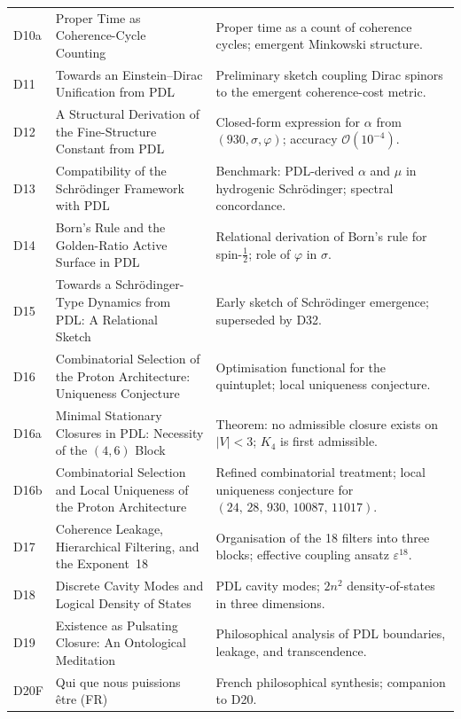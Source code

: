 \documentclass[11pt,a4paper]{article}
\theoremstyle{plain}
\theoremstyle{definition}
\theoremstyle{remark}
\newcommand{\quintuplet}{(24,\,28,\,930,\,10087,\,11017)}
\begin{document}
\begin{longtable}{L{1.3cm}L{3.8cm}L{8.0cm}}
D10a & Proper Time as Coherence-Cycle Counting~\cite{D10a} & Proper time as a count of coherence cycles; emergent Minkowski structure.\\[0.3em]
D11 & Towards an Einstein--Dirac Unification from PDL~\cite{D11} & Preliminary sketch coupling Dirac spinors to the emergent coherence-cost metric.\\[0.3em]
D12 & A Structural Derivation of the Fine-Structure Constant from PDL~\cite{D12} & Closed-form expression for $\alpha$ from $(930, \sigma, \varphi)$; accuracy $\mathcal{O}(10^{-4})$.\\[0.3em]
D13 & Compatibility of the Schr\"odinger Framework with PDL~\cite{D13} & Benchmark: PDL-derived $\alpha$ and $\mu$ in hydrogenic Schr\"odinger; spectral concordance.\\[0.3em]
D14 & Born's Rule and the Golden-Ratio Active Surface in PDL~\cite{D14} & Relational derivation of Born's rule for spin-$\tfrac{1}{2}$; role of $\varphi$ in $\sigma$.\\[0.3em]
D15 & Towards a Schr\"odinger-Type Dynamics from PDL: A Relational Sketch~\cite{D15} & Early sketch of Schr\"odinger emergence; superseded by D32.\\[0.3em]
D16 & Combinatorial Selection of the Proton Architecture: Uniqueness Conjecture~\cite{D16} & Optimisation functional for the quintuplet; local uniqueness conjecture.\\[0.3em]
D16a & Minimal Stationary Closures in PDL: Necessity of the $(4,6)$ Block~\cite{D16a} & \textcolor{proofblue}{Theorem}: no admissible closure exists on $|V|<3$; $K_4$ is first admissible.\\[0.3em]
D16b & Combinatorial Selection and Local Uniqueness of the Proton Architecture~\cite{D16b} & Refined combinatorial treatment; local uniqueness conjecture for $\quintuplet$.\\[0.3em]
D17 & Coherence Leakage, Hierarchical Filtering, and the Exponent~18~\cite{D17} & Organisation of the 18 filters into three blocks; effective coupling ansatz $\varepsilon^{18}$.\\[0.3em]
D18 & Discrete Cavity Modes and Logical Density of States~\cite{D18} & PDL cavity modes; $2n^2$ density-of-states in three dimensions.\\[0.3em]
D19 & Existence as Pulsating Closure: An Ontological Meditation~\cite{D19} & Philosophical analysis of PDL boundaries, leakage, and transcendence.\\[0.3em]
D20F & Qui que nous puissions \^etre (FR)~\cite{D20F} & French philosophical synthesis; companion to D20.\\[0.3em]

\end{longtable}
\end{document}
